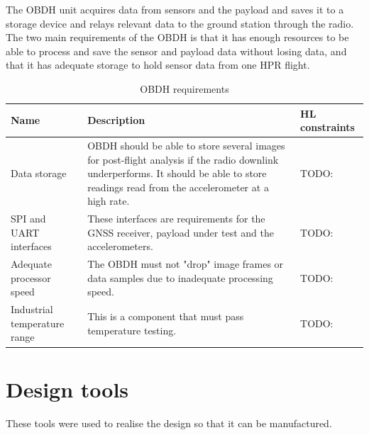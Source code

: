 \documentclass[draft]{report}
\begin{document}
The OBDH unit acquires data from sensors and the payload and saves it to a storage device and relays relevant data to the ground station through the radio. The two main requirements of the OBDH is that it has enough resources to be able to process and save the sensor and payload data without losing data, and that it has adequate storage to hold sensor data from one HPR flight.

\begin{table}[H]
  \centering
  \begin{tabular}{|L{0.2\textwidth}|L{0.495\textwidth}|L{0.2\textwidth}|}
    \hline
    \textbf{Name}                & \textbf{Description}                                                                                                                                                                      & \textbf{HL constraints} \\ \hline
    Data storage                 & OBDH should be able to store several images for post-flight analysis if the radio downlink underperforms. It should be able to store readings read from the accelerometer at a high rate. & TODO:                   \\\hline
    SPI and UART interfaces      & These interfaces are requirements for the GNSS receiver, payload under test and the accelerometers.                                                                                       & TODO:                   \\\hline
    Adequate processor speed     & The OBDH must not "drop" image frames or data samples due to inadequate processing speed.                                                                                                 & TODO:                   \\\hline
    Industrial temperature range & This is a component that must pass temperature testing.                                                                                                                                   & TODO:                   \\\hline
  \end{tabular}
  \caption{OBDH requirements}
  \label{tabl:obdh-requirements}
\end{table}


\section{Design tools}
\label{sec:design-tools}

These tools were used to realise the design so that it can be manufactured.
\end{document}
